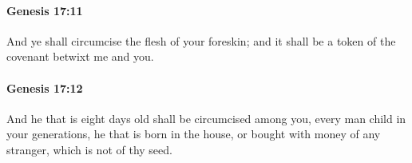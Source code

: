 		\paragraph{Genesis 17:11} %
			\label{GENESIS-17-11}

			And ye shall circumcise the flesh of your foreskin; and it shall be a token of the covenant betwixt me and you.


		\paragraph{Genesis 17:12} %
			\label{GENESIS-17-12}

			And he that is eight days old shall be circumcised among you, every man child in your generations, he that is born in the house, or bought with money of any stranger, which is not of thy seed.


